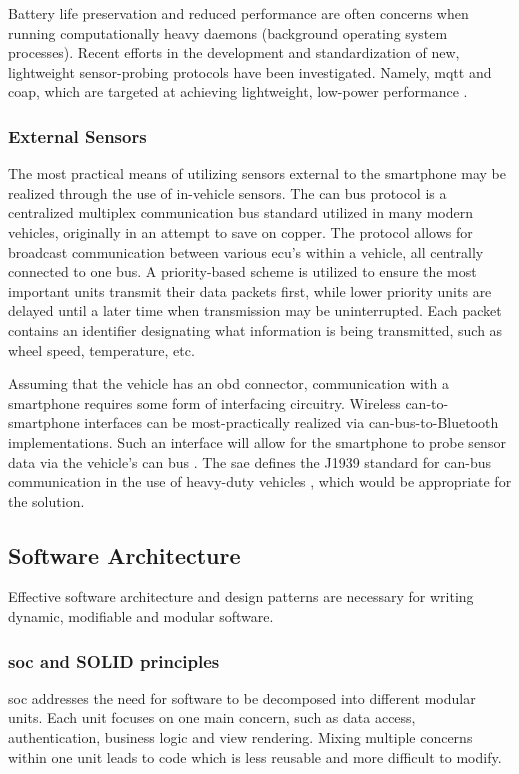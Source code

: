 Battery life preservation and reduced performance are often concerns when running computationally heavy daemons (background operating system processes).
Recent efforts in the development and standardization of new, lightweight sensor-probing protocols have been investigated.
Namely, \ac{mqtt} and \ac{coap}, which are targeted at achieving lightweight, low-power performance \cite{de2013comparison}.

\subsubsection{External Sensors}
The most practical means of utilizing sensors external to the smartphone may be realized through the use of in-vehicle sensors. 
The \ac{can} bus protocol is a centralized multiplex communication bus standard utilized in many modern vehicles, originally in an attempt to save on copper. 
The protocol allows for broadcast communication between various \ac{ecu}'s within a vehicle, all centrally connected to one bus.
A priority-based scheme is utilized to ensure the most important units transmit their data packets first, while lower priority units are delayed until a later time when transmission may be uninterrupted. Each packet contains an identifier designating what information is being transmitted, such as wheel speed, temperature, etc.
\cite{van2011canauth}

Assuming that the vehicle has an \ac{obd} connector, communication with a smartphone requires some form of interfacing circuitry.
Wireless \ac{can}-to-smartphone interfaces can be most-practically realized via \ac{can}-bus-to-Bluetooth implementations.
Such an interface will allow for the smartphone to probe sensor data via the vehicle's \ac{can} bus \cite{campolo2012smartcar} \cite{walter2013smartphone}.
The \ac{sae} defines the J1939 standard for \ac{can}-bus communication in the use of heavy-duty vehicles \cite{stepper1993j1939}, which would be appropriate for the solution.

\subsection{Software Architecture}
Effective software architecture and design patterns are necessary for writing dynamic, modifiable and modular software.

\subsubsection{\ac{soc} and SOLID principles}
\Ac{soc} addresses the need for software to be decomposed into different modular units.
Each unit focuses on one main concern, such as data access, authentication, business logic and view rendering.
Mixing multiple concerns within one unit leads to code which is less reusable and more difficult to modify.
\cite{gamageseparation}

